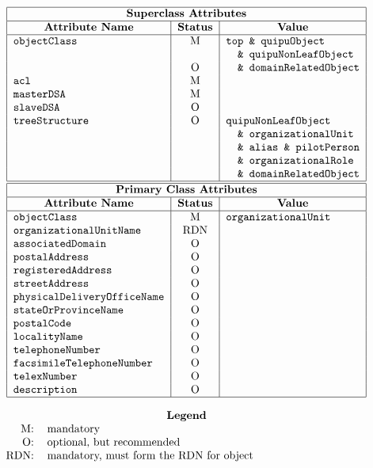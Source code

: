 
\smaller

\[\begin{tabular}{|l|c|l|}
\hline
\multicolumn{3}{|c|}{\bf Superclass Attributes}\\
\hline
\multicolumn{1}{|c|}{\bf Attribute Name}&
			\multicolumn{1}{c|}{\bf Status}&
				\multicolumn{1}{c|}{\bf Value}\\
\hline
\verb"objectClass"&	M&	\verb"top & quipuObject"\\
&			&	\verb"  & quipuNonLeafObject"\\
&			O&	\verb"  & domainRelatedObject"\\
\verb"acl"&		M&	\\
\verb"masterDSA"&	M&	\\
\verb"slaveDSA"&	O&	\\
\verb"treeStructure"&	O&	\verb"quipuNonLeafObject"\\
&			&	\verb"  & organizationalUnit"\\
&			&	\verb"  & alias & pilotPerson"\\
&			&	\verb"  & organizationalRole"\\
&			&	\verb"  & domainRelatedObject"\\
\hline
\hline
\multicolumn{3}{|c|}{\bf Primary Class Attributes}\\
\hline
\multicolumn{1}{|c|}{\bf Attribute Name}&
			\multicolumn{1}{c|}{\bf Status}&
				\multicolumn{1}{c|}{\bf Value}\\
\hline
\verb"objectClass"&	M&	\verb"organizationalUnit"\\
\verb"organizationalUnitName"&
			RDN&	\\
\verb"associatedDomain"&
			O&	\\
\verb"postalAddress"&	O&	\\
\verb"registeredAddress"&
			O&	\\
\verb"streetAddress"&	O&	\\
\verb"physicalDeliveryOfficeName"&
			O&	\\
\verb"stateOrProvinceName"&
			O&	\\
\verb"postalCode"&	O&	\\
\verb"localityName"&	O&	\\
\verb"telephoneNumber"&	O&	\\
\verb"facsimileTelephoneNumber"&
			O&	\\
\verb"telexNumber"&	O&	\\
\verb"description"&	O&	\\
\hline
\end{tabular}\]

\[\begin{tabular}{rp{4in}}
\multicolumn{2}{c}{\bf Legend}\\
M:&	mandatory\\
O:&	optional, but recommended\\
RDN:&	mandatory, must form the RDN for object
\end{tabular}\]

